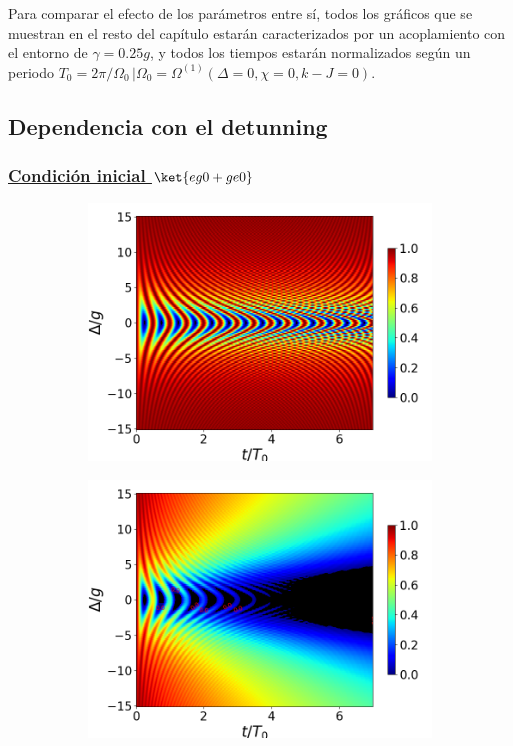 Para comparar el efecto de los parámetros entre sí, todos los gráficos que se muestran en el resto del capítulo estarán caracterizados por un acoplamiento con el entorno de $\gamma=0.25g$, y todos los tiempos estarán normalizados según un periodo $T_0=2\pi/\Omega_0 \, | \Omega_0=\Omega^{(1)}(\Delta=0,\chi=0,k-J=0)$.
\subsection{Dependencia con el detunning}
\subsubsection{\underline{Condición inicial $\ket{eg0+ge0}$}}
\begin{figure}[h]
    \centering
    \begin{subfigure}{0.49\textwidth}
        \includegraphics[width=\textwidth]{figuras/ch4/concu/delta/eg0+ge0 k=0.0g x=0.0g J=0.0g gamma=0.25g concu delta uni.png}
        \caption{}
        \label{fig4:concu detunning 0 uni}
    \end{subfigure}
    \hfill
    \begin{subfigure}{0.49\textwidth}
        \includegraphics[width=\textwidth]{figuras/ch4/concu/delta/eg0+ge0 k=0.0g x=0.0g J=0.0g gamma=0.25g concu delta dis.png}

\end{subfigure}
\end{figure}

